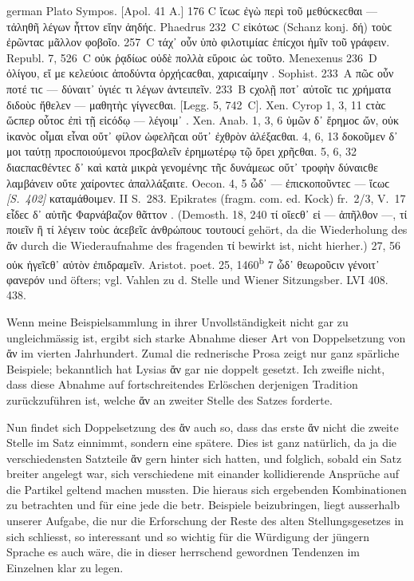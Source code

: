 \begin{otherlanguage*}{german}
Plato Sympos. [Apol. 41 Α.] 176 C ἴϲωϲ  ἐγὼ περὶ τοῦ μεθύϲκεϲθαι — τἀληθῆ λέγων ἧττον  εἴην ἀηδήϲ. Phaedrus 232~C εἰκότωϲ  (Schanz konj. δή) τοὺϲ ἐρῶνταϲ μᾶλλον  φοβοῖο. 257~C τάχ᾽ οὖν  ὑπὸ φιλοτιμίαϲ ἐπίϲχοι ἡμῖν  τοῦ γράφειν. Republ. 7, 526~C οὐκ  ῥᾳδίωϲ οὐδὲ πολλὰ  εὕροιϲ ὡϲ τοῦτο. Menexenus 236~D  ὀλίγου, εἴ με κελεύοιϲ ἀποδύντα ὀρχήϲαϲθαι, χαριϲαίμην . Sophist. 233~A πῶϲ οὖν  ποτέ τιϲ — δύναιτ᾽  ὑγιέϲ τι λέγων ἀντειπεῖν. 233~Β ϲχολῇ ποτ᾽  αὐτοῖϲ τιϲ χρήματα διδοὺϲ ἤθελεν  — μαθητὴϲ γίγνεϲθαι. [Legg. 5, 742~C]. Xen. Cyrop 1, 3, 11 ϲτὰϲ  ὥϲπερ οὗτοϲ ἐπὶ τῇ εἰϲόδῳ — λέγοιμ᾽ . Xen. Anab. 1, 3, 6 ὑμῶν δ᾽ ἔρημοϲ ὤν, οὐκ  ἱκανὸϲ οἶμαι εἶναι οὔτ᾽  φίλον ὠφελῆϲαι οὔτ᾽  ἐχθρὸν ἀλέξαϲθαι. 4, 6, 13 δοκοῦμεν δ᾽  μοι ταύτῃ προϲποιούμενοι προϲβαλεῖν ἐρημωτέρῳ  τῷ ὄρει χρῆϲθαι. 5, 6, 32 διαϲπαϲθέντεϲ δ᾽  καὶ κατὰ μικρὰ γενομένηϲ τῆϲ δυνάμεωϲ οὔτ᾽  τροφὴν δύναιϲθε λαμβάνειν οὔτε χαίροντεϲ  ἀπαλλάξαιτε. Oecon. 4, 5 ὦδ᾽  — ἐπιϲκοποῦντεϲ — ἴϲωϲ   \hypertarget{p402}{\emph{[S.~402]}}\label{p402} καταμάθοιμεν. II S.~283. Epikrates (fragm. com. ed. Kock) fr.~2/3, V.~17 εἶδεϲ δ᾽  αὐτῆϲ Φαρνάβαζον θᾶττον . (Demosth. 18, 240 τί  οἴεϲθ᾽ εἰ — ἀπῆλθον —, τί ποιεῖν  ἢ τί λέγειν τοὺϲ ἀϲεβεῖϲ ἀνθρώπουϲ τουτουϲί gehört, da die Wiederholung des ἄν durch die Wiederaufnahme des fragenden τί bewirkt ist, nicht hierher.) 27, 56 οὐκ  ἡγεῖϲθ᾽ αὐτὸν  ἐπιδραμεῖν. Aristot. poet. 25, 1460\textsuperscript{b} 7 ὧδ᾽  θεωροῦϲιν γένοιτ᾽  φανερόν und öfters; vgl. Vahlen zu d. Stelle und Wiener Sitzungsber. LVI 408. 438.

Wenn meine Beispielsammlung in ihrer Unvollständigkeit nicht gar zu ungleichmässig ist, ergibt sich starke Abnahme dieser Art von Doppelsetzung von ἄν im vierten Jahrhundert. Zumal die rednerische Prosa zeigt nur ganz spärliche Beispiele; bekanntlich hat Lysias ἄν gar nie doppelt gesetzt. Ich zweifle nicht, dass diese Abnahme auf fortschreitendes Erlöschen derjenigen Tradition zurückzuführen ist, welche ἄν an zweiter Stelle des Satzes forderte.

Nun findet sich Doppelsetzung des ἄν auch so, dass das erste ἄν nicht die zweite Stelle im Satz einnimmt, sondern eine spätere. Dies ist ganz natürlich, da ja die verschiedensten Satzteile ἄν gern hinter sich hatten, und folglich, sobald ein Satz breiter angelegt war, sich verschiedene mit einander kollidierende Ansprüche auf die Partikel geltend machen mussten. Die hieraus sich ergebenden Kombinationen zu betrachten und für eine jede die betr. Beispiele beizubringen, liegt ausserhalb unserer Aufgabe, die nur die Erforschung der Reste des alten Stellungsgesetzes in sich schliesst, so interessant und so wichtig für die Würdigung der jüngern Sprache es auch wäre, die in dieser herrschend gewordnen Tendenzen im Einzelnen klar zu legen.


\end{otherlanguage*}
